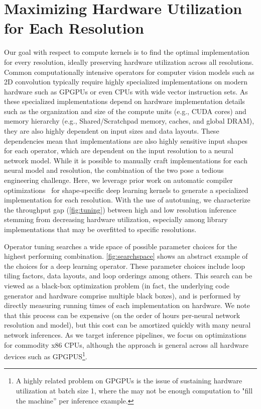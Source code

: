 \section{Maximizing Hardware Utilization for Each Resolution}
Our goal with respect to compute kernels is to find the optimal implementation for every resolution, ideally preserving hardware utilization across all resolutions.
Common computationally intensive operators for computer vision models such as 2D convolution typically require highly specialized implementations on modern hardware such as GPGPUs or even CPUs with wide vector instruction sets.
As these specialized implementations depend on hardware implementation details such as the organization and size of the compute units (e.g., CUDA cores) and memory hierarchy (e.g., Shared/Scratchpad memory, caches, and global DRAM), they are also highly dependent on input sizes and data layouts.
These dependencies mean that implementations are also highly sensitive input shapes for each operator, which are dependent on the input resolution to a neural network model.
While it is possible to manually craft implementations for each neural model and resolution, the combination of the two pose a tedious engineering challenge.
Here, we leverage prior work on automatic compiler optimizations~\cite{chen2018learning} for shape-specific deep learning kernels to generate a specialized implementation for each resolution.
With the use of autotuning, we characterize the throughput gap (\autoref{fig:tuning}) between high and low resolution inference stemming from decreasing hardware utilization, especially among library implementations that may be overfitted to specific resolutions.

Operator tuning searches a wide space of possible parameter choices for the highest performing combination.
\autoref{fig:searchspace} shows an abstract example of the choices for a deep learning operator.
These parameter choices include loop tiling factors, data layouts, and loop orderings among others.
This search can be viewed as a black-box optimization problem (in fact, the underlying code generator and hardware comprise multiple black boxes), and is performed by directly measuring running times of each implementation on hardware.
We note that this process can be expensive (on the order of hours per-neural network resolution and model), but this cost can be amortized quickly with many neural network inferences.
As we target inference pipelines, we focus on optimizations for commodity x86 CPUs, although the approach is general across all hardware devices such as GPGPUS\footnote{A highly related problem on GPGPUs is the issue of sustaining hardware utilization at batch size 1, where the may not be enough computation to "fill the machine'' per inference example.}.



